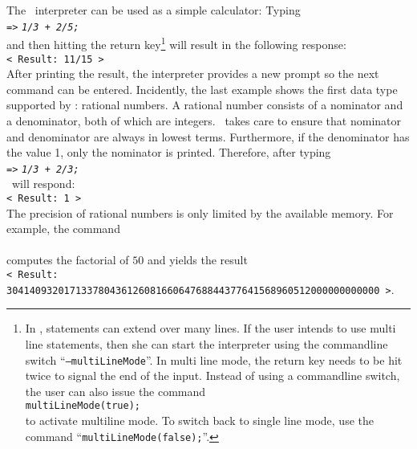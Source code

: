 \noindent
The \setlx\  interpreter can be used as a simple calculator:
Typing 
\\[0.2cm]
\hspace*{1.3cm}
\texttt{=>} \texttt{\textsl{1/3 + 2/5;}}
\\[0.2cm]
and then hitting the return key\footnote{
In \setlx, statements can extend over many lines.  If the user intends to use multi line
statements, then she can start the interpreter using the commandline switch ``\texttt{--multiLineMode}''.
In multi line mode, the return key needs to be hit twice to signal
the end of the input.  Instead of using a commandline switch, the user can also issue the command
\\
\hspace*{1.3cm}
\texttt{multiLineMode(true);}
\\
to activate multiline mode.
To switch back to single line mode, use the command ``\texttt{multiLineMode(false);}''.
} 
will result in the following response:
\\[0.2cm]
\hspace*{1.3cm}
\texttt{< Result: 11/15 >}
\\[0.2cm]
After printing the result, the interpreter provides a new prompt so the next command can
be entered.  Incidently, the last 
example shows the first data type supported by \setlx: rational numbers.  A rational number
consists of a nominator and a denominator, both of which are integers.  \setlx\ takes care to
ensure that nominator and denominator are always in lowest terms.  Furthermore, if the
denominator has the value 1, only the nominator is printed.  Therefore, after typing
\\[0.2cm]
\hspace*{1.3cm}
\texttt{=>} \texttt{\textsl{1/3 + 2/3;}}
\\[0.2cm]
\setlx\ will respond:
\\[0.2cm]
\hspace*{1.3cm}
\texttt{< Result: 1 >}
\\[0.2cm]
The precision of rational numbers is only limited by the available memory.  For example, the command
\\[0.2cm]
\hspace*{1.3cm}
\\[0.2cm]
computes the factorial of $50$ and yields the result
\\[0.2cm]
\hspace*{0.1cm}
\texttt{< Result: 30414093201713378043612608166064768844377641568960512000000000000 >}.
